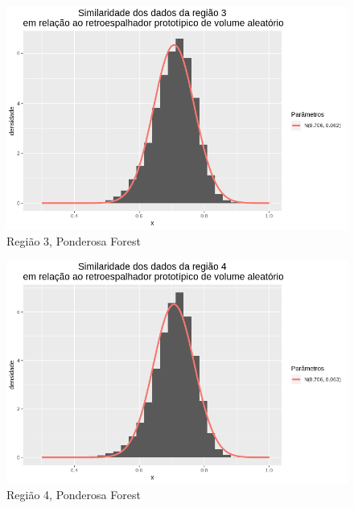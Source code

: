 \documentclass[12pt]{article}
\begin{document}
\begin{figure}[!h]
    \centering
    \vspace{0.1\linewidth}
    \includegraphics[width = \linewidth]{../../Images/Report_18_12_20/ponder_rv_region3.png}
    \caption{Região 3, Ponderosa Forest}
    \label{fig:pond_rv_r3}
\end{figure}

\begin{figure}[!h]
    \centering
    \vspace{0.1\linewidth}
    \includegraphics[width = \linewidth]{../../Images/Report_18_12_20/ponder_rv_region4.png}
    \caption{Região 4, Ponderosa Forest}
    \label{fig:pond_rv_r4}
\end{figure}
\end{document}
